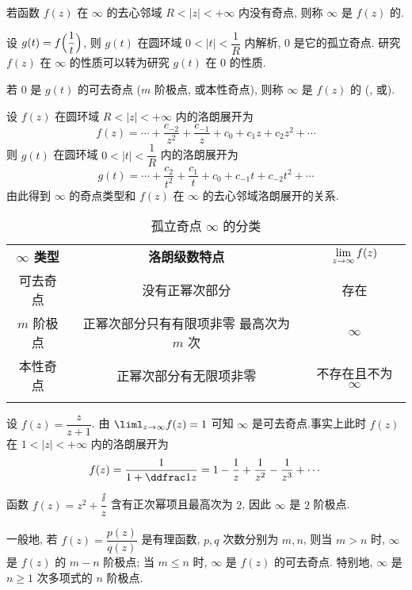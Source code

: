 \begin{definition}
  若函数 $f(z)$ 在 $\infty$ 的去心邻域 $R<|z|<+\infty$ 内没有奇点, 则称 $\infty$ 是 $f(z)$ 的.
\end{definition}

设 $g(t)=f\Bigl(\dfrac1t\Bigr)$, 则 $g(t)$ 在圆环域 $0<|t|<\dfrac1R$ 内解析, $0$ 是它的孤立奇点.
研究 $f(z)$ 在 $\infty$ 的性质可以转为研究 $g(t)$ 在 $0$ 的性质.

\begin{definition}
  若 $0$ 是 $g(t)$ 的可去奇点 ($m$ 阶极点, 或本性奇点), 则称 $\infty$ 是 $f(z)$ 的 (, 或).
\end{definition}

设 $f(z)$ 在圆环域 $R<|z|<+\infty$ 内的洛朗展开为
\[
  f(z)=\cdots+\frac{c_{-2}}{z^2}+\frac{c_{-1}}{z}+c_0+c_1z+c_2z^2+\cdots
\]
则 $g(t)$ 在圆环域 $0<|t|<\dfrac1R$ 内的洛朗展开为
\[
  g(t)=\cdots+\frac{c_2}{t^2}+\frac{c_1}t+c_0+c_{-1}t+c_{-2}t^2+\cdots
\]
由此得到 $\infty$ 的奇点类型和 $f(z)$ 在 $\infty$ 的去心邻域洛朗展开的关系.

\begin{table}[!htb]
  \centering
  \begin{tabular}{ccc}
    \topcolorrule
      \bf $\infty$ 类型&
      \bf 洛朗级数特点&
      $\lim\limits_{z\rightarrow\infty}f(z)$\\ 
    \topcolorrule
      可去奇点&
      没有正幂次部分&
      存在\\
    \midcolorrule
      $m$ 阶极点&
      \makecell{正幂次部分只有有限项非零\\最高次为 $m$ 次}&
      $\infty$\\
    \midcolorrule
      本性奇点&
      正幂次部分有无限项非零&
      不存在且不为 $\infty$\\ 
    \bottomcolorrule
  \end{tabular}
  \caption{孤立奇点 $\infty$ 的分类}
\end{table}

\begin{exampleenum}
  \item 设 $f(z)=\dfrac z{z+1}$.
  由 $\liml_{z\ra\infty}f(z)=1$ 可知 $\infty$ 是可去奇点.事实上此时 $f(z)$ 在 $1<|z|<+\infty$ 内的洛朗展开为
  \[
      f(z)=\frac{1}{1+\ddfrac1z}
    =1-\frac1z+\frac1{z^2}-\frac1{z^3}+\cdots
  \]
  \item 函数 $f(z)=z^2+\dfrac\ii z$ 含有正次幂项且最高次为 $2$, 因此 $\infty$ 是 $2$ 阶极点.

  一般地, 若 $f(z)=\dfrac{p(z)}{q(z)}$ 是有理函数, $p,q$ 次数分别为 $m,n$, 则当 $m>n$ 时, $\infty$ 是 $f(z)$ 的 $m-n$ 阶极点;
  当 $m\le n$ 时, $\infty$ 是 $f(z)$ 的可去奇点.
  特别地, $\infty$ 是 $n\ge1$ 次多项式的 $n$ 阶极点.
\end{exampleenum}


